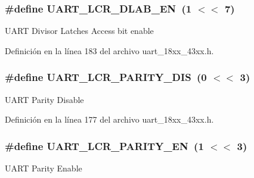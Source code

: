 \subsubsection[{\texorpdfstring{U\+A\+R\+T\+\_\+\+L\+C\+R\+\_\+\+D\+L\+A\+B\+\_\+\+EN}{UART_LCR_DLAB_EN}}]{\setlength{\rightskip}{0pt plus 5cm}\#define U\+A\+R\+T\+\_\+\+L\+C\+R\+\_\+\+D\+L\+A\+B\+\_\+\+EN~(1 $<$$<$ 7)}\hypertarget{group___u_a_r_t__18_x_x__43_x_x_gaae9c53e30321d4cac13137c66b022e9e}{}\label{group___u_a_r_t__18_x_x__43_x_x_gaae9c53e30321d4cac13137c66b022e9e}
U\+A\+RT Divisor Latches Access bit enable 

Definición en la línea 183 del archivo uart\+\_\+18xx\+\_\+43xx.\+h.

\subsubsection[{\texorpdfstring{U\+A\+R\+T\+\_\+\+L\+C\+R\+\_\+\+P\+A\+R\+I\+T\+Y\+\_\+\+D\+IS}{UART_LCR_PARITY_DIS}}]{\setlength{\rightskip}{0pt plus 5cm}\#define U\+A\+R\+T\+\_\+\+L\+C\+R\+\_\+\+P\+A\+R\+I\+T\+Y\+\_\+\+D\+IS~(0 $<$$<$ 3)}\hypertarget{group___u_a_r_t__18_x_x__43_x_x_ga91bc2978f5af5ac9a1f18af284275b39}{}\label{group___u_a_r_t__18_x_x__43_x_x_ga91bc2978f5af5ac9a1f18af284275b39}
U\+A\+RT Parity Disable 

Definición en la línea 177 del archivo uart\+\_\+18xx\+\_\+43xx.\+h.

\subsubsection[{\texorpdfstring{U\+A\+R\+T\+\_\+\+L\+C\+R\+\_\+\+P\+A\+R\+I\+T\+Y\+\_\+\+EN}{UART_LCR_PARITY_EN}}]{\setlength{\rightskip}{0pt plus 5cm}\#define U\+A\+R\+T\+\_\+\+L\+C\+R\+\_\+\+P\+A\+R\+I\+T\+Y\+\_\+\+EN~(1 $<$$<$ 3)}\hypertarget{group___u_a_r_t__18_x_x__43_x_x_ga4fba4b3d639bdfa713d12466d411f57c}{}\label{group___u_a_r_t__18_x_x__43_x_x_ga4fba4b3d639bdfa713d12466d411f57c}
U\+A\+RT Parity Enable 

